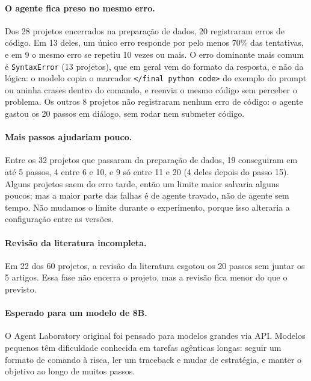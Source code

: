 \documentclass[11pt,a4paper]{article}
\begin{document}
\paragraph{O agente fica preso no mesmo erro.} Dos 28 projetos encerrados na preparação de
dados, 20 registraram erros de código. Em 13 deles, um único erro responde por pelo menos 70\%
das tentativas, e em 9 o mesmo erro se repetiu 10 vezes ou mais. O erro dominante mais comum é
\texttt{SyntaxError} (13 projetos), que em geral vem do formato da resposta, e não da lógica: o
modelo copia o marcador \verb|</final python code>| do exemplo do prompt ou aninha crases dentro
do comando, e reenvia o mesmo código sem perceber o problema. Os outros 8 projetos não
registraram nenhum erro de código: o agente gastou os 20 passos em diálogo, sem rodar nem
submeter código.

\paragraph{Mais passos ajudariam pouco.} Entre os 32 projetos que passaram da preparação de
dados, 19 conseguiram em até 5 passos, 4 entre 6 e 10, e 9 só entre 11 e 20 (4 deles depois
do passo 15). Alguns projetos saem do erro tarde, então um limite maior salvaria alguns poucos;
mas a maior parte das falhas é de agente travado, não de agente sem tempo. Não mudamos o limite
durante o experimento, porque isso alteraria a configuração entre as versões.

\paragraph{Revisão da literatura incompleta.} Em 22 dos 60 projetos, a revisão da literatura
esgotou os 20 passos sem juntar os 5 artigos. Essa fase não encerra o projeto, mas a revisão
fica menor do que o previsto.

\paragraph{Esperado para um modelo de 8B.} O Agent Laboratory original foi pensado para modelos
grandes via API. Modelos pequenos têm dificuldade conhecida em tarefas agênticas longas: seguir
um formato de comando à risca, ler um traceback e mudar de estratégia, e manter o objetivo ao
longo de muitos passos. %
\end{document}
